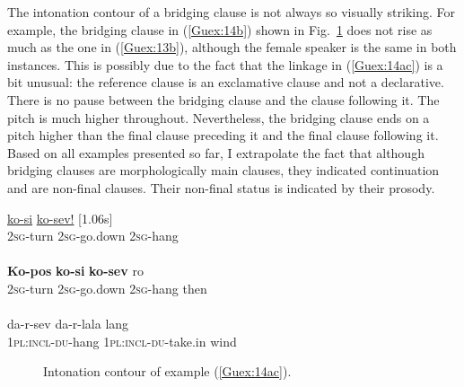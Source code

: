 \documentclass[output=paper]{LSP/langsci}
\begin{document}
The intonation contour of a bridging clause is not always so visually striking. For example, the bridging clause in (\ref{Guex:14b}) shown in  Fig.~\ref{GuF4} does not rise as much as the one in (\ref{Guex:13b}), although the female speaker is the same in both instances. This is possibly due to the fact that the linkage in (\ref{Guex:14ac}) is a bit unusual: the reference clause is an exclamative clause and not a declarative. There is no pause between the bridging clause and the clause following it. The pitch is much higher throughout. Nevertheless, the bridging clause ends on a pitch higher than the final clause preceding it and the final clause following it. Based on all examples presented so far, I  extrapolate the fact that although bridging clauses are morphologically main clauses, they indicated continuation and are non-final clauses. Their non-final status is indicated by their prosody.


\begin{exe}
\ex \label{Guex:14ac}
\begin{xlist}
\ex \label{Guex:14a}
\gll \underline{}          \underline{ko-si}                 \underline{ko-sev!}     [1.06s]\\
\textsc{2sg}-turn    \textsc{2sg}-go.down   \textsc{2sg}-hang \\
\glt {}\\
\ex \label{Guex:14b}
\gll \textbf{Ko-pos}          \textbf{ko-si}               \textbf{ko-sev}     ro \\
\textsc{2sg}-turn    \textsc{2sg}-go.down   \textsc{2sg}-hang then\\
\glt {}\\
\ex \label{Guex:14c}
\gll   da-r-sev                  da-r-lala               lang\\     	       
 \textsc{1pl:incl-du}-hang     \textsc{1pl:incl-du}-take.in   wind\\
\glt {} 
\end{xlist}
\end{exe}

\begin{figure}[ht]
\caption{Intonation contour of example (\ref{Guex:14ac}). \label{GuF4}}
\end{figure}
\end{document}
